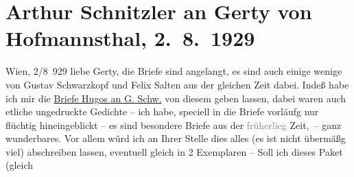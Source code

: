 

         
         \renewcommand{\erwaehntePersonen}{Personen: Gertrude von Hofmannsthal, Hugo von Hofmannsthal, Felix Salten, Gustav Schwarzkopf}
         \renewcommand{\erwaehnteOrte}{Orte: Bad Aussee, Wien}
         \renewcommand{\erwaehnteWerke}{}
               \section[Arthur Schnitzler an Gerty von Hofmannsthal, 2. 8. 1929]{ Arthur Schnitzler an Gerty von Hofmannsthal, 2. 8. 1929}\nopagebreak{}\rehead{ }\begin{ledgroupsized}[t]{13cm}\normalsize\beginnumbering{} \toendnotes[C]{\smallbreak\pagebreak[2]} 
\pstart
           \raggedleft{}{\pb}Wien, 2/8 929\pend
           \pstart
           liebe Gerty, die Briefe sind angelangt, es sind auch einige wenige
               von Gustav Schwarzkopf und Felix Salten aus der gleichen Zeit dabei.
                  Indeß habe ich mir die \uline{Briefe Hugos an G. Schw.} von diesem geben lassen, dabei waren auch etliche ungedruckte Gedichte – ich
               habe, speciell in die Briefe vorläufg nur flüchtig hineingeblickt – es sind besondere
               Briefe aus der \textcolor{gray}{früherlieg} Zeit, – ganz wunderbares. Vor allem würd
               ich \introOben{}an Ihrer Stelle\introOben{} dies alles (es ist nicht übermäßg viel)
               abschreiben lassen, eventuell gleich in 2 Exemplaren – Soll ich dieses Paket (gleich

\end{ledgroupsized}

